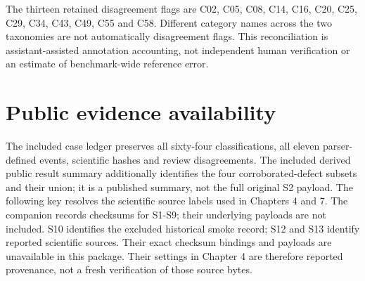 \documentclass[12pt,a4paper]{report}
\DeclareRobustCommand{\longtok}[1]{\texttt{\seqsplit{#1}}}
\begin{document}
The thirteen retained disagreement flags are C02, C05, C08, C14, C16,
C20, C25, C29, C34, C43, C49, C55 and C58. Different category names
across the two taxonomies are not automatically disagreement flags. This
reconciliation is assistant-assisted annotation accounting, not
independent human verification or an estimate of benchmark-wide
reference error.

\section{Public evidence
availability}\label{public-evidence-availability}

The included case ledger preserves all sixty-four classifications, all
eleven parser-defined events, scientific hashes and review
disagreements. The included derived public result summary additionally
identifies the four corroborated-defect subsets and their union; it is a
published summary, not the full original S2 payload. The following key
resolves the scientific source labels used in Chapters 4 and 7. The
companion \longtok{c1\_\allowbreak{}reference\_\allowbreak{}bindings.json} records checksums for
S1-S9; their underlying payloads are not included. S10 identifies the
excluded historical smoke record; S12 and S13 identify reported
scientific sources. Their exact checksum bindings and payloads are
unavailable in this package. Their settings in Chapter 4 are therefore
reported provenance, not a fresh verification of those source bytes.
\end{document}
